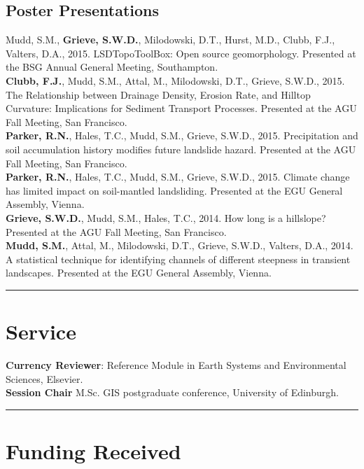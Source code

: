 \documentclass[10pt, a4paper]{article}
\newcommand{\years}[1]{\marginnote{\scriptsize #1}}
\begin{document}
\subsection*{Poster Presentations}

Mudd, S.M., \textbf{Grieve, S.W.D.}, Milodowski, D.T., Hurst, M.D., Clubb, F.J., Valters, D.A., 2015. LSDTopoToolBox: Open source geomorphology. Presented at the BSG Annual General Meeting, Southampton.\\[0.05cm]

\textbf{Clubb, F.J.}, Mudd, S.M., Attal, M., Milodowski, D.T., Grieve, S.W.D., 2015. The Relationship between Drainage Density, Erosion Rate, and Hilltop Curvature: Implications for Sediment Transport Processes. Presented at the AGU Fall Meeting, San Francisco.\\[0.05cm]

\textbf{Parker, R.N.}, Hales, T.C., Mudd, S.M., Grieve, S.W.D., 2015. Precipitation and soil accumulation history modifies future landslide hazard. Presented at the AGU Fall Meeting, San Francisco.\\[0.05cm]

\textbf{Parker, R.N.}, Hales, T.C., Mudd, S.M., Grieve, S.W.D., 2015. Climate change has limited impact on soil-mantled landsliding. Presented at the EGU General Assembly, Vienna.\\[0.05cm]

\textbf{Grieve, S.W.D.}, Mudd, S.M., Hales, T.C., 2014. How long is a hillslope? Presented at the AGU Fall Meeting, San Francisco.\\[0.05cm]

\textbf{Mudd, S.M.}, Attal, M., Milodowski, D.T., Grieve, S.W.D., Valters, D.A., 2014. A statistical technique for identifying channels of different steepness in transient landscapes. Presented at the EGU General Assembly, Vienna.\\[0.05cm]

\hrule
\section*{Service}
\noindent

\years{2015}\textbf{Currency Reviewer}: Reference Module in Earth Systems and Environmental Sciences, Elsevier.\\[0.05cm]
\years{2014--2015}\textbf{Session Chair} M.Sc. GIS postgraduate conference, University of Edinburgh.\\[0.05cm]

\hrule
\section*{Funding Received}
\noindent
\end{document}
